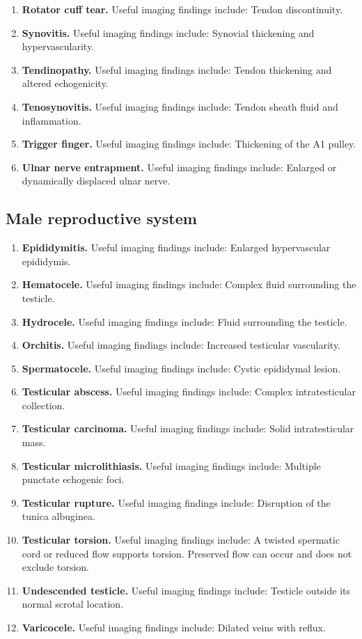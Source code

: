 \begin{enumerate}[leftmargin=*,itemsep=0.45em,topsep=0.4em]
\item \textbf{Rotator cuff tear.} Useful imaging findings include: Tendon discontinuity.
\item \textbf{Synovitis.} Useful imaging findings include: Synovial thickening and hypervascularity.
\item \textbf{Tendinopathy.} Useful imaging findings include: Tendon thickening and altered echogenicity.
\item \textbf{Tenosynovitis.} Useful imaging findings include: Tendon sheath fluid and inflammation.
\item \textbf{Trigger finger.} Useful imaging findings include: Thickening of the A1 pulley.
\item \textbf{Ulnar nerve entrapment.} Useful imaging findings include: Enlarged or dynamically displaced ulnar nerve.
\end{enumerate}

\subsection{Male reproductive system}
\begin{enumerate}[leftmargin=*,itemsep=0.45em,topsep=0.4em]
\item \textbf{Epididymitis.} Useful imaging findings include: Enlarged hypervascular epididymis.
\item \textbf{Hematocele.} Useful imaging findings include: Complex fluid surrounding the testicle.
\item \textbf{Hydrocele.} Useful imaging findings include: Fluid surrounding the testicle.
\item \textbf{Orchitis.} Useful imaging findings include: Increased testicular vascularity.
\item \textbf{Spermatocele.} Useful imaging findings include: Cystic epididymal lesion.
\item \textbf{Testicular abscess.} Useful imaging findings include: Complex intratesticular collection.
\item \textbf{Testicular carcinoma.} Useful imaging findings include: Solid intratesticular mass.
\item \textbf{Testicular microlithiasis.} Useful imaging findings include: Multiple punctate echogenic foci.
\item \textbf{Testicular rupture.} Useful imaging findings include: Disruption of the tunica albuginea.
\item \textbf{Testicular torsion.} Useful imaging findings include: A twisted spermatic cord or reduced flow supports torsion. Preserved flow can occur and does not exclude torsion.
\item \textbf{Undescended testicle.} Useful imaging findings include: Testicle outside its normal scrotal location.
\item \textbf{Varicocele.} Useful imaging findings include: Dilated veins with reflux.
\end{enumerate}

